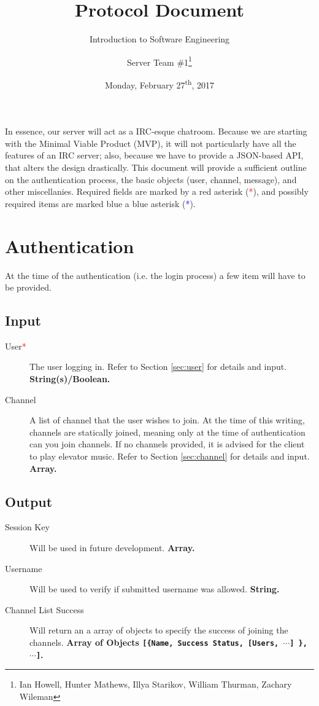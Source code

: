\documentclass[12pt]{scrartcl}
\title{Protocol Document}
\subtitle{Introduction to Software Engineering}
\author{Server Team \#1\thanks{Ian Howell, Hunter Mathews, Illya Starikov, William Thurman, Zachary Wileman}}
\date{Monday, February 27\textsuperscript{th}, 2017}
\newcommand{\req}{\textcolor{red}{*}}
\newcommand{\reqalt}{\textcolor{blue}{*}}
\begin{document}
\maketitle

In essence, our server will act as a IRC-esque chatroom. Because we are starting with the Minimal Viable Product (MVP), it will not particularly have all the features of an IRC server; also, because we have to provide a JSON-based API, that alters the design drastically. This document will provide a sufficient outline on the authentication process, the basic objects (user, channel, message), and other miscellanies. Required fields are marked by a red asterisk (\req), and possibly required items are marked blue a blue asterisk (\reqalt).


\section{Authentication}
At the time of the authentication (i.e. the login process) a few item will have to be provided.

\subsection{Input}
\begin{description}
    \item[User\req] The user logging in. Refer to Section \ref{sec:user} for details and input. \textbf{String(s)/Boolean.}
    \item[Channel] A list of channel that the user wishes to join. At the time of this writing, channels are statically joined, meaning only at the time of authentication can you join channels. If no channels provided, it is advised for the client to play elevator music. Refer to Section \ref{sec:channel} for details and input. \textbf{Array.}
\end{description}

\subsection{Output}
\begin{description}
    \item[Session Key] Will be used in future development. \textbf{Array.}
    \item[Username] Will be used to verify if submitted username was allowed. \textbf{String.}
    \item[Channel List Success] Will return an a array of objects to specify the success of joining the channels. \textbf{Array of Objects \texttt{[\{Name, Success Status, [Users, $\cdots$] \}, $\cdots$]}.}
\end{description}
\end{document}
